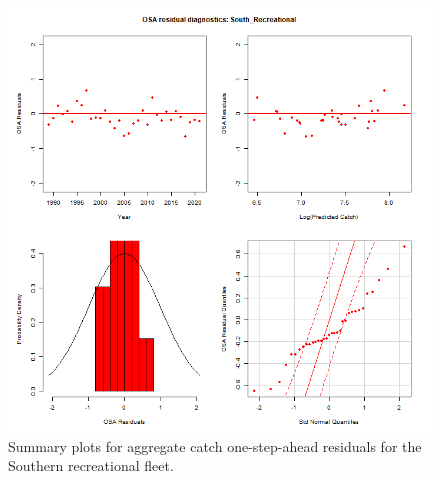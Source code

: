 \documentclass[
]{article}
\begin{document}
\begin{figure}

{\centering \includegraphics[width=1\linewidth]{../2023.RT.Runs/Run34/plots_png/diagnostics/OSA_resid_catch_4panel_South_Recreational} 

}

\caption{Summary plots for aggregate catch one-step-ahead residuals for the Southern recreational fleet.}\label{fig:osa-South-rec-catch-summ}
\end{figure}
\end{document}
